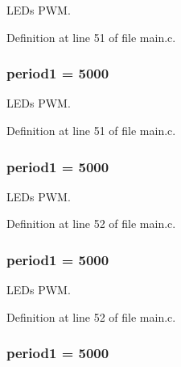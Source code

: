 L\-E\-Ds P\-W\-M. 



Definition at line 51 of file main.\-c.

\hypertarget{group___revolution_b_l_gabe751b3d399e053031c1e3db20b6b071}{
\subsubsection[{period1}]{ period1 = 5000}}\label{group___revolution_b_l_gabe751b3d399e053031c1e3db20b6b071}


L\-E\-Ds P\-W\-M. 



Definition at line 51 of file main.\-c.

\hypertarget{group___revolution_b_l_gabe751b3d399e053031c1e3db20b6b071}{
\subsubsection[{period1}]{ period1 = 5000}}\label{group___revolution_b_l_gabe751b3d399e053031c1e3db20b6b071}


L\-E\-Ds P\-W\-M. 



Definition at line 52 of file main.\-c.

\hypertarget{group___revolution_b_l_gabe751b3d399e053031c1e3db20b6b071}{
\subsubsection[{period1}]{ period1 = 5000}}\label{group___revolution_b_l_gabe751b3d399e053031c1e3db20b6b071}


L\-E\-Ds P\-W\-M. 



Definition at line 52 of file main.\-c.

\hypertarget{group___revolution_b_l_gabe751b3d399e053031c1e3db20b6b071}{
\subsubsection[{period1}]{ period1 = 5000}}\label{group___revolution_b_l_gabe751b3d399e053031c1e3db20b6b071}


